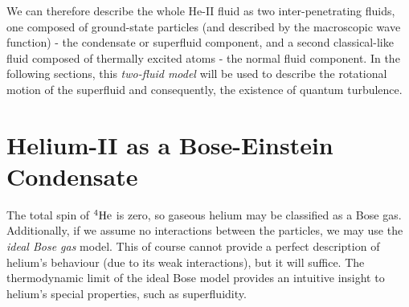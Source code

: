 We can therefore describe the whole He-II fluid as two inter-penetrating fluids, one composed of ground-state particles (and described by the macroscopic wave function) - the condensate or superfluid component, and a second classical-like fluid composed of thermally excited atoms - the normal fluid component. In the following sections, this \emph{two-fluid model} will be used to describe the rotational motion of the superfluid and consequently, the existence of quantum turbulence.

\newpage

\section{Helium-II as a Bose-Einstein Condensate}
The total spin of ${}^4\mathrm{He}$ is zero, so gaseous helium may be classified as a Bose gas. Additionally, if we assume no interactions between the particles, we may use the \textit{ideal Bose gas} model. This of course cannot provide a perfect description of helium's behaviour (due to its weak interactions), but it will suffice. The thermodynamic limit of the ideal Bose model provides an intuitive insight to helium's special properties, such as superfluidity.

\newpage
